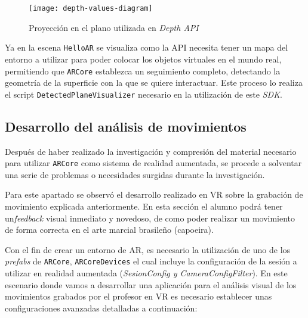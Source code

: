 \begin{figure}[h!]
    \centering 
    \texttt{[image: depth-values-diagram]}
    \caption{Proyección en el plano utilizada en \textit{Depth API}}
    \label{fig:depth-values-diagram}
\end{figure} 

Ya en la escena \texttt{HelloAR} se visualiza como la API necesita tener un mapa del entorno a utilizar para poder colocar los objetos virtuales en el mundo real, permitiendo que \texttt{ARCore} establezca un seguimiento completo, detectando la geometría de la superficie con la que se quiere interactuar. Este proceso lo realiza el script \texttt{DetectedPlaneVisualizer} necesario en la utilización de este \textit{SDK}.

\subsection{Desarrollo del análisis de movimientos}

Después de haber realizado la investigación y compresión del material necesario para utilizar \texttt{ARCore} como sistema de realidad aumentada, se procede a solventar una serie de problemas o necesidades surgidas durante la investigación.

Para este apartado se observó el desarrollo realizado en VR sobre la grabación de movimiento explicada anteriormente. En esta sección el alumno podrá tener un\textit{feedback} visual inmediato y novedoso, de como poder realizar un movimiento de forma correcta en el arte marcial brasileño (capoeira).

Con el fin de crear un entorno de AR, es necesario la utilización de uno de los \textit{prefabs} de \texttt{ARCore}, \texttt{ARCoreDevices} el cual incluye la configuración de la sesión a utilizar en realidad aumentada (\textit{SesionConfig y CameraConfigFilter}). En este escenario donde vamos a desarrollar una aplicación para el análisis visual de los movimientos grabados por el profesor en VR es necesario establecer unas configuraciones avanzadas detalladas a continuación:

